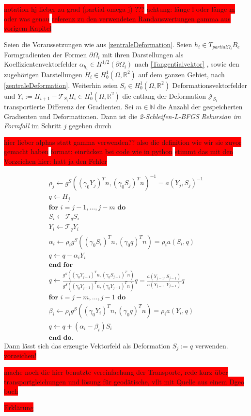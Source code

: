 \colorbox{red}{notation hj lieber zu grad (partial omega j) ???}
\colorbox{red}{ achtung: länge l oder länge m oder was genau}
\colorbox{red}{referenz zu den verwendeten Randauswertungen gamma aus vorigem Kapitel}

\begin{defi}
	Seien die Voraussetzungen wie aus \ref{zentraleDeformation}. Seien $h_i \in T_{partial\Omega_i}B_e$ Formgradienten der Formen $\partial\Omega_i$ mit ihren Darstellungen als Koeffizientenvektorfelder $\alpha_{h_i} \in H^{1/2}(\partial\Omega_i)$ nach \ref{Tangentialvektor} , sowie den zugehörigen Darstellungen $H_i \in H^1_0(\Omega, \mathbb{R}^2)$ auf dem ganzen Gebiet, nach \ref{zentraleDeformation}. Weiterhin seien $S_i \in H^1_0(\Omega, \mathbb{R}^2)$ Deformationsvektorfelder und $Y_i := H_{i+1} - \mathcal{T}_{S_i}H_i \in H^1_0(\Omega, \mathbb{R}^2)$ die entlang der Deformation $\mathcal{J}_{S_i}$ transportierte Differenz der Gradienten. Sei $m \in \mathbb{N}$ die Anzahl der gespeicherten Gradienten und Deformationen. Dann ist die \textit{2-Schleifen-L-BFGS Rekursion im Formfall} im Schritt $j$ gegeben durch 

\colorbox{red}{hier lieber alphas statt gamma verwenden?? also die definition wie wir sie zuvor gemacht haben}
\colorbox{red}{format: einrücken bei code wie in python}
\colorbox{red}{stimmt das mit den Vorzeichen hier: hatt ja den Fehler}

\begin{align*}
	\rho_j \leftarrow g^S((\gamma_0 Y_j)^Tn, (\gamma_0 S_j)^Tn)^{-1} = a(Y_j, S_j)^{-1} \\
		q \leftarrow H_j \\
	\textbf{for } i = j - 1, \dots, j - m \textbf{ do} \\
		S_i \leftarrow \mathcal{T}_q S_i \\
		Y_i \leftarrow \mathcal{T}_q Y_i \\
		\alpha_i \leftarrow \rho_i g^S((\gamma_0 S_i)^Tn, (\gamma_0 q)^T n) = \rho_i a(S_i, q) \\
				q \leftarrow q - \alpha_i Y_i \\
	\textbf{end for} \\
	q \leftarrow \frac{g^S((\gamma_0 Y_{j-1})^Tn, (\gamma_0 S_{j-1})^Tn)}{g^S((\gamma_0 Y_{j-1})^Tn, (\gamma_0 Y_{j-1})^Tn)}q = \frac{a(Y_{j-1}, S_{j-1})}{a(Y_{j-1}, Y_{j-1})}q \\	
	\textbf{for } i = j - m, \dots, j - 1 \textbf{ do} \\
		\beta_i \leftarrow \rho_i g^S((\gamma_0 Y_i)^Tn, (\gamma_0 q)^Tn) = \rho_i a(Y_i, q) \\
		q \leftarrow q + (\alpha_i - \beta_i)S_i \\
		\textbf{end do.}
\end{align*}
	Dann lässt sich das erzeugte Vektorfeld als Deformation $S_j := q$ verwenden. \colorbox{red}{vorzeichen!}
\end{defi}

\colorbox{red}{mache noch die hier benutzte vereinfachung der Transporte, rede kurz über transportgleichungen und lösung für geodätische, vllt mit Quelle aus einem Dgeo buch}


\colorbox{red}{Erklärung}

